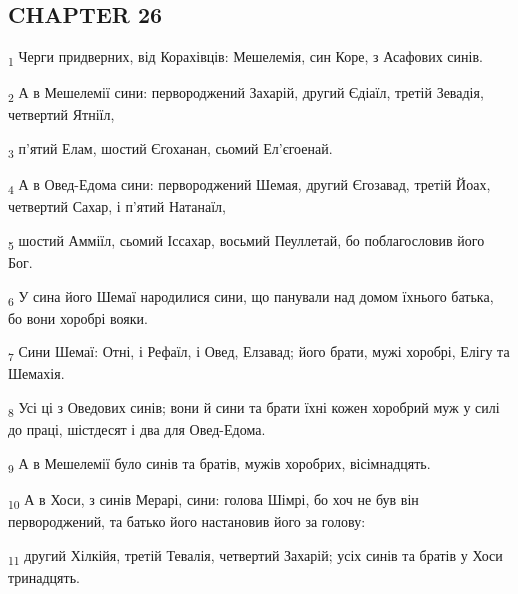 \subsection{CHAPTER 26}
\begin{tcolorbox}
\textsubscript{1} Черги придверних, від Корахівців: Мешелемія, син Коре, з Асафових синів.
\end{tcolorbox}
\begin{tcolorbox}
\textsubscript{2} А в Мешелемії сини: первороджений Захарій, другий Єдіаїл, третій Зевадія, четвертий Ятніїл,
\end{tcolorbox}
\begin{tcolorbox}
\textsubscript{3} п'ятий Елам, шостий Єгоханан, сьомий Ел'єгоенай.
\end{tcolorbox}
\begin{tcolorbox}
\textsubscript{4} А в Овед-Едома сини: первороджений Шемая, другий Єгозавад, третій Йоах, четвертий Сахар, і п'ятий Натанаїл,
\end{tcolorbox}
\begin{tcolorbox}
\textsubscript{5} шостий Амміїл, сьомий Іссахар, восьмий Пеуллетай, бо поблагословив його Бог.
\end{tcolorbox}
\begin{tcolorbox}
\textsubscript{6} У сина його Шемаї народилися сини, що панували над домом їхнього батька, бо вони хоробрі вояки.
\end{tcolorbox}
\begin{tcolorbox}
\textsubscript{7} Сини Шемаї: Отні, і Рефаїл, і Овед, Елзавад; його брати, мужі хоробрі, Елігу та Шемахія.
\end{tcolorbox}
\begin{tcolorbox}
\textsubscript{8} Усі ці з Оведових синів; вони й сини та брати їхні кожен хоробрий муж у силі до праці, шістдесят і два для Овед-Едома.
\end{tcolorbox}
\begin{tcolorbox}
\textsubscript{9} А в Мешелемії було синів та братів, мужів хоробрих, вісімнадцять.
\end{tcolorbox}
\begin{tcolorbox}
\textsubscript{10} А в Хоси, з синів Мерарі, сини: голова Шімрі, бо хоч не був він первороджений, та батько його настановив його за голову:
\end{tcolorbox}
\begin{tcolorbox}
\textsubscript{11} другий Хілкійя, третій Тевалія, четвертий Захарій; усіх синів та братів у Хоси тринадцять.
\end{tcolorbox}
